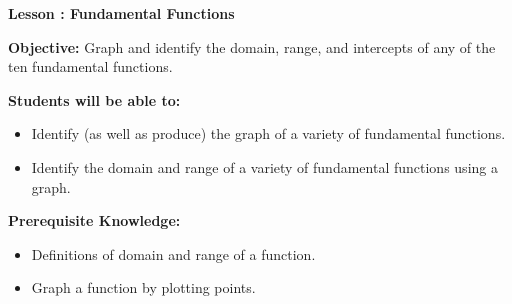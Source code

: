 \documentclass[12pt]{article}
\theoremstyle{definition}
\begin{document}
{\bf \large Lesson : Fundamental Functions}
\hfill \doclicenseImage[imagewidth=5em]\\
\par
{\bf Objective:} Graph and identify the domain, range, and intercepts of any of the ten fundamental functions.\\
\par
{\bf Students will be able to:}
\begin{itemize}
	\item Identify (as well as produce) the graph of a variety of fundamental functions.
	\item Identify the domain and range of a variety of fundamental functions using a graph.
\end{itemize}
{\bf Prerequisite Knowledge:}
\begin{itemize}
	\item Definitions of domain and range of a function.
	\item Graph a function by plotting points.
\end{itemize}
\hrulefill
\end{document}
